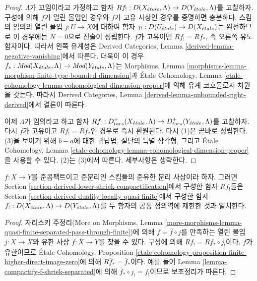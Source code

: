\begin{proof}
$\Lambda$가 꼬임이라고 가정하고 함자
$Rf_! : D(X_{\acute{e}tale}, \Lambda) \to D(Y_{\acute{e}tale}, \Lambda)$를
고찰하자. 구성에 의해 $f$가 열린 몰입인 경우와 $f$가 고유 사상인
경우를 증명하면 충분하다. 스킴의 임의의 열린 몰입
$j : U \to X$에 대하여 함자
$j_! : D(U_{\acute{e}tale}) \to D(X_{\acute{e}tale})$는 완전하므로 이 경우에는
$N = 0$으로 진술이 성립한다.
$f$가 고유이면 $Rf_! = Rf_*$, 즉 오른쪽 유도 함자이다.
따라서 왼쪽 유계성은 Derived Categories, Lemma
\ref{derived-lemma-negative-vanishing}에서 따른다.
더욱이 이 경우
$f_* : \textit{Mod}(X_{\acute{e}tale}, \Lambda)
\to \textit{Mod}(Y_{\acute{e}tale}, \Lambda)$는 Morphisms, Lemma
\ref{morphisms-lemma-morphism-finite-type-bounded-dimension}과
\'Etale Cohomology, Lemma
\ref{etale-cohomology-lemma-cohomological-dimension-proper}에 의해
유계 코호몰로지 차원을 갖는다. 따라서 Derived Categories, Lemma
\ref{derived-lemma-unbounded-right-derived}에서 결론이 따른다.

\medskip\noindent
이제 $\Lambda$가 임의라고 하고 함자
$Rf_! : D^+_{tors}(X_{\acute{e}tale}, \Lambda) \to D^+_{tors}(Y_{\acute{e}tale}, \Lambda)$를
고찰하자. 다시 $f$가 고유이고 $Rf_! = Rf_*$인 경우로 즉시 환원된다.
다시 (1)은 곧바로 성립한다. (3)을 보이기 위해 $b - a$에 대한 귀납법,
절단의 특별 삼각형, 그리고 \'Etale Cohomology, Lemma
\ref{etale-cohomology-lemma-cohomological-dimension-proper}을
사용할 수 있다.
(2)는 (3)에서 따른다. 세부사항은 생략한다.
\end{proof}

\begin{lemma}
\label{lemma-Rf-shriek-for-quasi-finite}
$f : X \to Y$를 준콤팩트이고 준분리인 스킴들의 준유한 분리 사상이라
하자. 그러면 Section
\ref{section-derived-lower-shriek-compactification}에서 구성한
함자 $Rf_!$들은 Section
\ref{section-derived-duality-locally-quasi-finite}에서 구성한 함자
$f_! : D(X_{\acute{e}tale}, \Lambda) \to D(Y_{\acute{e}tale}, \Lambda)$를 두 함자의
공통 정의역에 제한한 것과 일치한다.
\end{lemma}

\begin{proof}
자리스키 주정리(More on Morphisms, Lemma
\ref{more-morphisms-lemma-quasi-finite-separated-pass-through-finite})에
의해 $f = \overline{f} \circ j$를 만족하는 열린 몰입
$j : X \to \overline{X}$와 유한 사상
$\overline{f} : \overline{X} \to Y$를 찾을 수 있다.
구성에 의해 $Rf_! = R\overline{f}_* \circ j_!$이다.
$\overline{f}$가 유한이므로 \'Etale Cohomology, Proposition
\ref{etale-cohomology-proposition-finite-higher-direct-image-zero}에
의해 $R\overline{f}_* = \overline{f}_*$이다.
예를 들어 Lemma \ref{lemma-compactify-f-shriek-separated}에 의해
$\overline{f}_* \circ j_! = f_!$이므로 보조정리가 따른다.
\end{proof}

